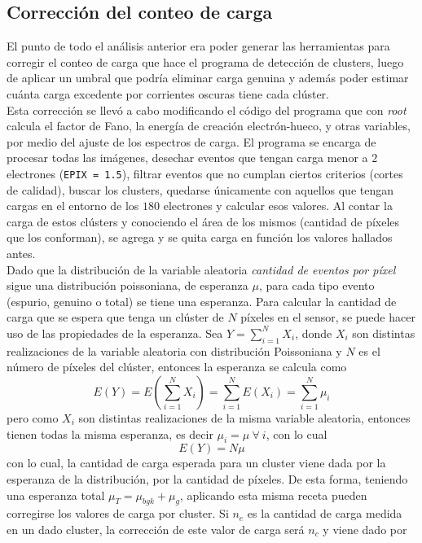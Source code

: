 \subsection{Corrección del conteo de carga}
\noindent El punto de todo el análisis anterior era poder generar las herramientas para corregir el conteo de carga que hace el programa de detección de clusters, luego de aplicar un umbral que podría eliminar carga genuina y además poder estimar cuánta carga excedente por corrientes oscuras tiene cada clúster.\\
\indent Esta corrección se llevó a cabo modificando el código del programa que con \textit{root} calcula el factor de Fano, la energía de creación electrón-hueco, y otras variables, por medio del ajuste de los espectros de carga. El programa se encarga de procesar todas las imágenes, desechar eventos que tengan carga menor a $2$ electrones (\verb|EPIX = 1.5|), filtrar eventos que no cumplan ciertos criterios (cortes de calidad), buscar los clusters, quedarse únicamente con aquellos que tengan cargas en el entorno de los $180$ electrones y calcular esos valores. Al contar la carga de estos clústers y conociendo el área de los mismos (cantidad de píxeles que los conforman), se agrega y se quita carga en función los valores hallados antes.\\
\indent Dado que la distribución de la variable aleatoria \textit{cantidad de eventos por píxel} sigue una distribución poissoniana, de esperanza $\mu$, para cada tipo evento (espurio, genuino o total) se tiene una esperanza. Para calcular la cantidad de carga que se espera que tenga un clúster de $N$ píxeles en el sensor, se puede hacer uso de las propiedades de la esperanza. Sea $Y = \sum\limits_{i = 1}^{N} X_{i}$, donde $X_{i}$ son distintas realizaciones de la variable aleatoria con distribución Poissoniana y $N$ es el número de píxeles del clúster, entonces la esperanza se calcula como
\begin{equation*}
    E(Y) = 
    E
    \left(
        \sum\limits_{i=1}^{N} X_{i}
    \right)
    = \sum\limits_{i=1}^{N}E(X_{i})
    = \sum\limits_{i=1}^{N}\mu_{i}
\end{equation*}
pero como $X_{i}$ son distintas realizaciones de la misma variable aleatoria, entonces tienen todas la misma esperanza, es decir $\mu_{i} = \mu\ \forall\ i$, con lo cual
\begin{equation*}
    E(Y) = N\mu
\end{equation*}
con lo cual, la cantidad de carga esperada para un cluster viene dada por la esperanza de la distribución, por la cantidad de píxeles. De esta forma, teniendo una esperanza total $\mu_{T} = \mu_{bgk} + \mu_{g}$, aplicando esta misma receta pueden corregirse los valores de carga por cluster. Si $n_{e}$ es la cantidad de carga medida en un dado cluster, la corrección de este valor de carga será $n_{c}$ y viene dado por
